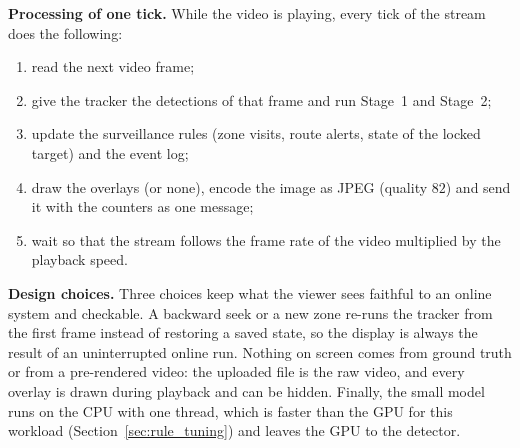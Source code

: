 \textbf{Processing of one tick.} While the video is playing, every tick of the stream does the following:
\begin{enumerate}
    \item read the next video frame;
    \item give the tracker the detections of that frame and run Stage~1 and Stage~2;
    \item update the surveillance rules (zone visits, route alerts, state of the locked target) and the event log;
    \item draw the overlays (or none), encode the image as JPEG (quality $82$) and send it with the counters as one message;
    \item wait so that the stream follows the frame rate of the video multiplied by the playback speed.
\end{enumerate}

\textbf{Design choices.} Three choices keep what the viewer sees faithful to an online system and checkable. A backward seek or a new zone re-runs the tracker from the first frame instead of restoring a saved state, so the display is always the result of an uninterrupted online run. Nothing on screen comes from ground truth or from a pre-rendered video: the uploaded file is the raw video, and every overlay is drawn during playback and can be hidden. Finally, the small model runs on the CPU with one thread, which is faster than the GPU for this workload (Section~\ref{sec:rule_tuning}) and leaves the GPU to the detector.



